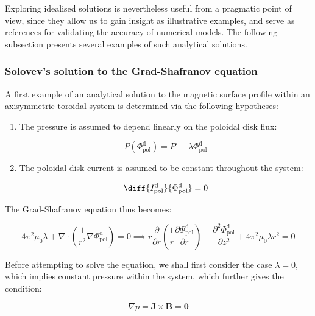 \quad Exploring idealised solutions is nevertheless useful from a pragmatic point of view, since they allow us to gain insight as illustrative examples, and serve as references for validating the accuracy of numerical models. The following subsection presents several examples of such analytical solutions.

\subsubsection{Solovev's solution to the Grad-Shafranov equation}

A first example of an analytical solution to the magnetic surface profile within an axisymmetric toroidal system is determined via the following hypotheses:

\begin{enumerate}
    \item The pressure is assumed to depend linearly on the poloidal disk flux:

    \begin{equation}
        P(\Phi_\text{pol}^\mathrm{d})=P^\square+\lambda\Phi_\text{pol}^\mathrm{d}
    \end{equation}

    \item The poloidal disk current is assumed to be constant throughout the system:

    \begin{equation}
        \diff{I_\text{pol}^\mathrm{d}}{\Phi_\text{pol}^\mathrm{d}}=0
    \end{equation}
\end{enumerate}

The Grad-Shafranov equation thus becomes:

\begin{equation}
    \label{eq-6-61}
    4\pi^2\mu_0\lambda+\nabla\cdot\left(\frac{1}{r^2}\nabla\Phi_\text{pol}^\mathrm{d}\right)=0\implies r\frac{\partial}{\partial r}\left(\frac{1}{r}\frac{\partial\Phi_\text{pol}^\mathrm{d}}{\partial r}\right)+\frac{\partial^2\Phi_\text{pol}^\mathrm{d}}{\partial z^2}+4\pi^2\mu_0\lambda r^2=0
\end{equation}

Before attempting to solve the equation, we shall first consider the case $\lambda=0$, which implies constant pressure within the system, which further gives the condition:

\begin{equation}
    \nabla p=\mathbf{J}\times\mathbf{B}=\mathbf{0}
\end{equation}

